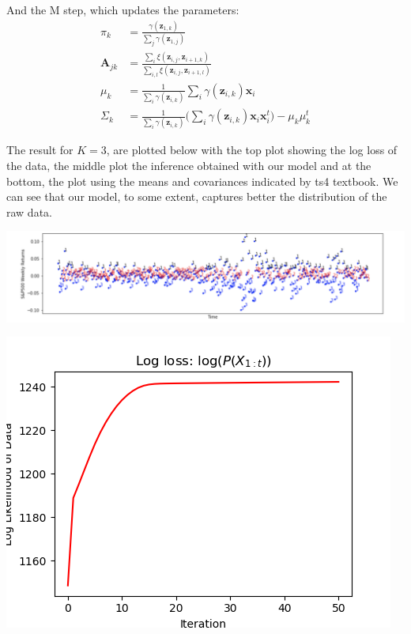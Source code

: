 \documentclass[12pt]{article}
\newcommand{\vect}[1]{\mathbf{#1}}
\newcommand{\matr}[1]{\bm{#1}}
\begin{document}
And the M step, which updates the parameters:
\begin{align*}
	\pi_k			&=	\frac{ \gamma(\vect{z}_{1,k}) } {\sum_j \gamma(\vect{z}_{1,j}) } \\
	\matr{A}_{jk}	&=	\frac{ \sum_i \xi(\vect{z}_{i,j} , \vect{z}_{i+1,k})}	{ \sum_{i,l} \xi(\vect{z}_{i,j} , \vect{z}_{i+1,l}) } \\
	\mu_k		&=	\frac{1} {\sum_i \gamma(\vect{z}_{i,k}) }  \sum_i \gamma(\vect{z}_{i,k}) \vect{x}_i \\
	\Sigma_k		&= 	\frac{1} {\sum_i \gamma(\vect{z}_{i,k}) }  \bigg(	\sum_i \gamma(\vect{z}_{i,k}) \vect{x}_i  \vect{x}_i^t	\bigg) - \mu_k \mu_k^t
\end{align*}

The result for $K=3$, are plotted below with the top plot showing the log loss of the data, the middle plot the inference obtained with our model and at the bottom, the plot using the means and covariances
indicated by ts4 textbook.  We can see that our model, to some extent, captures better the distribution of the raw data.

\begin{center}
	\includegraphics[width=1\linewidth]{figures/problem-3-1.png} 
\end{center}

\begin{center}
	\includegraphics[width=1\linewidth]{figures/problem-3-2.png} 
\end{center}
\end{document}
